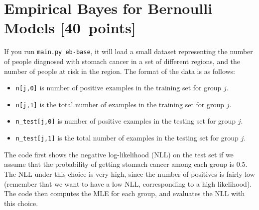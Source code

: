 \documentclass{article}
\newcommand{\pts}[1]{\textcolor{points}{[#1~points]}}
\begin{document}
\clearpage
\section{Empirical Bayes for Bernoulli Models \pts{40}}

If you run \texttt{main.py eb-base}, it will load a small dataset representing the number of people diagnosed with stomach cancer in a set of different regions, and the number of people at risk in the region. The format of the data is as follows:
\begin{itemize}
  \item \texttt{n[j,0]} is number of positive examples in the training set for group $j$.
  \item \texttt{n[j,1]} is the total number of examples in the training set for group $j$.
  \item \texttt{n\_test[j,0]} is number of positive examples in the testing set for group $j$.
  \item \texttt{n\_test[j,1]} is the total number of examples in the testing set for group $j$.
\end{itemize}
The code first shows the negative log-likelihood (NLL) on the test set if we assume that the probability of getting stomach cancer among each group is 0.5. The NLL under this choice is very high, since the number of positives is fairly low (remember that we want to have a low NLL, corresponding to a high likelihood). The code then computes the MLE for each group, and evaluates the NLL with this choice.
\end{document}
